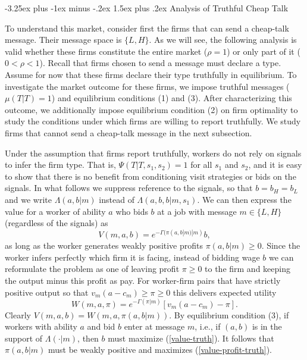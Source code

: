 \documentclass[12pt]{article}
\makeatletter
\renewcommand{\subsection}{%
  \@startsection{subsection}{2}{\z@}%
  {-3.25ex plus -1ex minus -.2ex}%
  {1.5ex plus .2ex}%
  {\normalfont\large\bfseries}%
}
\makeatother
\begin{document}
\subsection{Analysis of Truthful Cheap Talk}\label{sec:truthful}

To understand this market, consider first the firms that can send a cheap-talk message. Their message space is $\{L,H\}$. As we will see, the following analysis is valid whether these firms constitute the entire market ($\rho=1$) or only part of it ($0<\rho<1$). Recall that firms chosen to send a message must declare a type. Assume for now that these firms declare their type truthfully in equilibrium. To investigate the market outcome for these firms, we impose truthful messages ($\mu(T|T)=1$) and equilibrium conditions (1) and (3). After characterizing this outcome, we additionally impose equilibrium condition (2) on firm optimality to study the conditions under which firms are willing to report truthfully. We study firms that cannot send a cheap-talk message in the next subsection.

Under the assumption that firms report truthfully, workers do not rely on signals to infer the firm type. That is, $\Psi(T|T,s_{1},s_{2})=1$ for all $s_{1}$ and $s_{2}$, and it is easy to show that there is no benefit from conditioning visit strategies or bids on the signals. In what follows we suppress reference to the signals, so that $b=b_{H}=b_{L}$ and we write $\Lambda(a,b|m)$ instead of $\Lambda(a,b,b|m,s_{1})$. We can then express the value for a worker of ability $a$ who bids $b$ at a job with message $m\in\{L,H\}$ (regardless of the signals) as
\begin{equation}
V(m,a,b)=e^{-\Gamma (\pi (a,b|m)|m)}b,
\label{value-truth}
\end{equation}%
as long as the worker generates weakly positive profits $\pi (a,b|m)\geq 0$.
Since the worker infers perfectly which firm it is facing, instead of
bidding wage $b$ we can reformulate the problem as one of leaving profit $%
\pi \geq 0$ to the firm and keeping the output minus this profit as pay. For
worker-firm pairs that have strictly positive output so that $%
v_{m}(a-c_{m})\geq \pi \geq 0$ this delivers expected utility 
\begin{equation}
W(m,a,\pi )=e^{-\Gamma (\pi |m)}\left[ v_{m}(a-c_{m})-\pi \right] .
\label{value-profit-truth}
\end{equation}%
Clearly $V(m,a,b)=W(m,a,\pi(a,b|m))$. By equilibrium condition (3), if workers with ability $a$ and bid $b$ enter at message $m$, i.e., if $(a,b)$ is in the support of $\Lambda(\cdot|m)$, then $b$ must maximize (\ref{value-truth}). It follows that $\pi(a,b|m)$ must be weakly positive and maximizes (\ref{value-profit-truth}).
\end{document}
